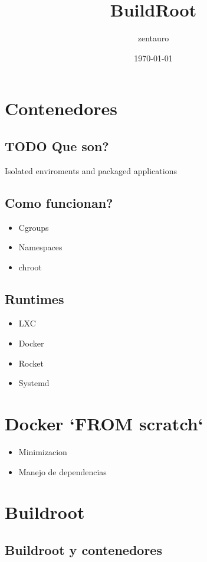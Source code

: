\documentclass[11pt]{article}
\author{zentauro}
\date{\today}
\title{BuildRoot}
\begin{document}
\maketitle
\tableofcontents


\section{Contenedores}
\label{sec:orgc8f1cbd}
\subsection{{\bfseries\sffamily TODO} Que son?}
\label{sec:org0c57ecb}
Isolated enviroments and packaged applications
\subsection{Como funcionan?}
\label{sec:org64a5145}
\begin{itemize}
\item Cgroups
\item Namespaces
\item chroot
\end{itemize}
\subsection{Runtimes}
\label{sec:orgf7096b8}
\begin{itemize}
\item LXC
\item Docker
\item Rocket
\item Systemd
\end{itemize}

\section{Docker `FROM scratch`}
\label{sec:org82fd817}
\begin{itemize}
\item Minimizacion
\item ‎Manejo de dependencias
\end{itemize}

\section{Buildroot}
\label{sec:org4c1f124}
\subsection{Buildroot y contenedores}
\label{sec:orgd894efc}
\end{document}
